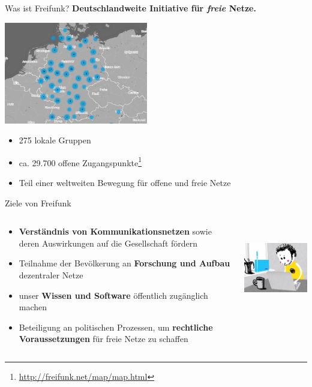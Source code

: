\documentclass[10pt]{beamer}
\begin{document}
    \begin{frame}{Was ist Freifunk?}
      \large \textbf{Deutschlandweite Initiative für \emph{freie} Netze.}
      \pause
      \begin{center}
        \includegraphics[height=12em]{images/2016-02-17_map-de}
      \end{center}
      \begin{itemize}
        \item 275 lokale Gruppen
        \item ca. 29.700 offene Zugangspunkte\footnote{\url{http://freifunk.net/map/map.html}}
        \item Teil einer weltweiten Bewegung für offene und freie Netze
      \end{itemize}
    \end{frame}

    \begin{frame}{Ziele von Freifunk}
      \begin{columns}[T]
        \begin{column}{5cm}
          \begin{itemize}
            \item \textbf{Verständnis von Kommunikationsnetzen} sowie deren Auswirkungen auf die Gesellschaft fördern
            \item Teilnahme der Bevölkerung an \textbf{Forschung und Aufbau} dezentraler Netze
            \item unser \textbf{Wissen und Software} öffentlich zugänglich machen
            \item Beteiligung an politischen Prozessen, um \textbf{rechtliche Voraussetzungen} für freie Netze zu schaffen
          \end{itemize}
        \end{column}
        \begin{column}{5cm}
          \includegraphics[height=10em]{images/install}
        \end{column}
      \end{columns}
    \end{frame}
\end{document}
